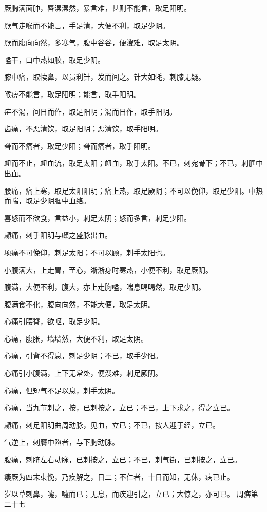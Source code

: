 \documentclass[a4paper,12pt,UTF8,twoside]{ctexbook}
\begin{document}
	厥胸满面肿，唇漯漯然，暴言难，甚则不能言，取足阳明。
	
	厥气走喉而不能言，手足清，大便不利，取足少阴。
	
	厥而腹向向然，多寒气，腹中谷谷，便溲难，取足太阴。
	
	嗌干，口中热如胶，取足少阴。
	
	膝中痛，取犊鼻，以员利针，发而间之。针大如牦，刺膝无疑。
	
	喉痹不能言，取足阳明；能言，取手阳明。
	
	疟不渴，间日而作，取足阳明；渴而日作，取手阳明。
	
	齿痛，不恶清饮，取足阳明；恶清饮，取手阳明。
	
	聋而不痛者，取足少阳；聋而痛者，取手阳明。
	
	衄而不止，衄血流，取足太阳；衄血，取手太阳。不已，刺宛骨下；不已，刺腘中出血。
	
	腰痛，痛上寒，取足太阳阳明；痛上热，取足厥阴；不可以俛仰，取足少阳。中热而喘，取足少阴腘中血络。
	
	喜怒而不欲食，言益小，刺足太阴；怒而多言，刺足少阳。
	
	顑痛，刺手阳明与顑之盛脉出血。
	
	项痛不可俛仰，刺足太阳；不可以顾，刺手太阳也。
	
	小腹满大，上走胃，至心，淅淅身时寒热，小便不利，取足厥阴。
	
	腹满，大便不利，腹大，亦上走胸嗌，喘息喝喝然，取足少阴。
	
	腹满食不化，腹向向然，不能大便，取足太阴。
	
	心痛引腰脊，欲呕，取足少阴。
	
	心痛，腹胀，墙墙然，大便不利，取足太阴。
	
	心痛，引背不得息，刺足少阴；不已，取手少阳。
	
	心痛引小腹满，上下无常处，便溲难，刺足厥阴。
	
	心痛，但短气不足以息，刺手太阴。
	
	心痛，当九节刺之，按，已刺按之，立已；不已，上下求之，得之立已。
	
	顑痛，刺足阳明曲周动脉，见血，立已；不已，按人迎于经，立已。
	
	气逆上，刺膺中陷者，与下胸动脉。
	
	腹痛，刺脐左右动脉，已刺按之，立已；不已，刺气街，已刺按之，立已。
	
	痿厥为四末束悗，乃疾解之，日二；不仁者，十日而知，无休，病已止。
	
	岁以草刺鼻，嚏，嚏而已；无息，而疾迎引之，立已；大惊之，亦可已。
	周痹第二十七
	
\end{document}
